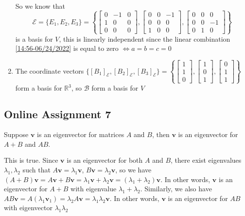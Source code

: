 \documentclass[a4paper,10pt]{article}
\begin{document}
\begin{solution}
\begin{enumerate}[label=\alph*)]
\begin{equation}
\begin{aligned}
\end{aligned}
\end{equation}
So we know that
\[
\mathcal E=\{E_1,E_2,E_3\}=
\left\{
\begin{bmatrix}
0&-1&0\\
1&0&0\\
0&0&0
\end{bmatrix},\begin{bmatrix}
0&0&-1\\
0&0&0\\
1&0&0
\end{bmatrix},\begin{bmatrix}
0&0&0\\
0&0&-1\\
0&1&0
\end{bmatrix}\right\}
\]
is a basis for $V$, this is linearly independent since the linear combination \eqref{14:56-06/24/2022} is equal to zero $\iff a=b=c=0$
\item The coordinate vectors $\{[B_1]_{\mathcal E},[B_2]_{\mathcal E},[B_3]_{\mathcal E}\}=\left\{\begin{bmatrix}
1\\1\\0
\end{bmatrix},\begin{bmatrix}
1\\0\\1
\end{bmatrix},\begin{bmatrix}
0\\1\\1
\end{bmatrix}\right\}$ form a basis for $\mathbb R^3$, so $\mathcal B$ form a basis for $V$
\end{enumerate}
\end{solution}

\subsection{Online Assignment 7}

\begin{problem}
Suppose $\mathbf v$ is an eigenvector for matrices $A$ and $B$, then $\mathbf v$ is an eigenvector for $A+B$ and $AB$.
\end{problem}

\begin{solution}
This is true. Since $\mathbf v$ is an eigenvector for both $A$ and $B$, there exist eigenvalues $\lambda_1,\lambda_2$ such that $A\mathbf v=\lambda_1\mathbf v$, $B\mathbf v=\lambda_2\mathbf v$, so we have $(A+B)\mathbf v=A\mathbf v+B\mathbf v=\lambda_1\mathbf v+\lambda_2\mathbf v=(\lambda_1+\lambda_2)\mathbf v$. In other words, $\mathbf v$ is an eigenvector for $A+B$ with eigenvalue $\lambda_1+\lambda_2$. Similarly, we also have $AB\mathbf v=A(\lambda_1\mathbf v_1)=\lambda_2 A\mathbf v=\lambda_1\lambda_2\mathbf v$. In other words, $\mathbf v$ is an eigenvector for $AB$ with eigenvector $\lambda_1\lambda_2$
\end{solution}
\end{document}
